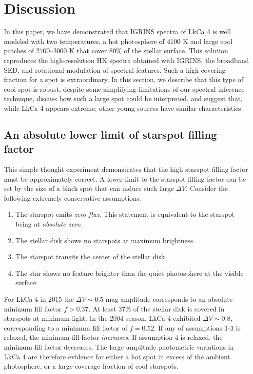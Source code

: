\documentclass[twocolumn]{emulateapj}%
\begin{document}
\section{Discussion}


In this paper, we have demonstrated that IGRINS spectra of LkCa 4 is well modeled with two temperatures, a hot photosphere of 4100 K and large cool patches of 2700--3000 K that cover 80\% of the stellar surface.  This solution reproduces the high-resolution HK spectra obtained with IGRINS, the broadband SED, and rotational modulation of spectral features.  Such a high covering fraction for a spot is extraordinary.  In this section, we describe that this type of cool spot is robust, despite some simplifying limitations of our spectral inference technique, discuss how such a large spot could be interpreted, and suggest that, while LkCa 4 appears extreme, other young sources have similar characteristics.


\subsection{An absolute lower limit of starspot filling factor}

This simple thought experiment demonstrates that the high starspot filling factor must be approximately correct.  A lower limit to the starspot filling factor can be set by the size of a black spot that can induce such large $\Delta V$.  Consider the following extremely conservative assumptions:  \begin{enumerate}
  \item The starspot emits \emph{zero flux}.  This statement is equivalent to the starspot being at \emph{absolute zero}.
  \item The stellar disk shows no starspots at maximum brightness.
  \item The starspot transits the center of the stellar disk.
  \item The star shows no feature brighter than the quiet photosphere at the visible surface
\end{enumerate}

For LkCa 4 in 2015 the $\Delta V\sim 0.5$ mag amplitude corresponds to an absolute minimum fill factor $f>0.37$.  At least 37\% of the stellar disk is covered in starspots at minimum light.  In the 2004 season, LkCa 4 exhibited $\Delta V\sim 0.8$, corresponding to a minimum fill factor of $f=0.52$.  If any of assumptions 1-3 is relaxed, the minimum fill factor \emph{increases}.  If assumption 4 is relaxed, the minimum fill factor decreases.  The large amplitude photometric variations in LkCa 4 are therefore evidence for either a hot spot in excess of the ambient photosphere, or a large coverage fraction of cool starspots.  
\end{document}
